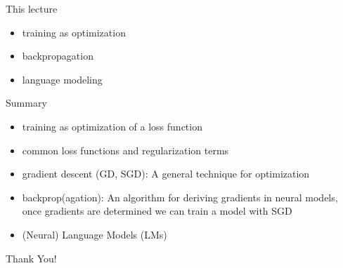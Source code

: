 \begin{frame}
\titlepage
\end{frame}
\begin{frame}{This lecture}
\vspace*{1cm}
\begin{itemize}
\item training as optimization
\item backpropagation
\item language modeling
\end{itemize}
\end{frame}



\begin{frame}{Summary}
    \begin{itemize}
        \item training as optimization of a loss function
        \item common loss functions and regularization terms
        \item gradient descent (GD, SGD): A general technique for optimization
        \item backprop(agation): An algorithm for deriving gradients in neural models, once  gradients are determined we can train a model with SGD
        \item (Neural) Language Models (LMs) 
    \end{itemize}
\end{frame}
\begin{frame}[c]
\centering
\LARGE{Thank You!}
\end{frame}

